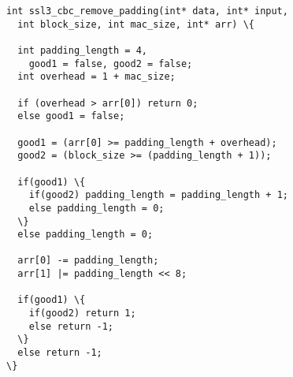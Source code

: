 \begin{minipage}[t]{3.1in}
\small
\begin{Verbatim}
int ssl3_cbc_remove_padding(int* data, int* input, 
  int block_size, int mac_size, int* arr) \{

  int padding_length = 4, 
    good1 = false, good2 = false;
  int overhead = 1 + mac_size;

  if (overhead > arr[0]) return 0;
  else good1 = false;

  good1 = (arr[0] >= padding_length + overhead);
  good2 = (block_size >= (padding_length + 1));
  
  if(good1) \{
    if(good2) padding_length = padding_length + 1;
    else padding_length = 0;
  \}
  else padding_length = 0;

  arr[0] -= padding_length;
  arr[1] |= padding_length << 8;

  if(good1) \{
    if(good2) return 1;
    else return -1;
  \}
  else return -1;
\}
\end{Verbatim}
\end{minipage}
